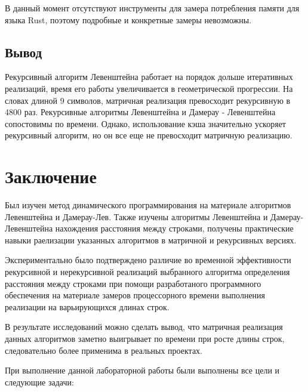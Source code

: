 \documentclass[12pt]{report}
\begin{document}
	\par
	В данный момент отсутствуют инструменты для замера потребления памяти для языка Rust, поэтому подробные и конкретные замеры невозможны.

	\section{Вывод}

	\par
	Рекурсивный алгоритм Левенштейна работает на порядок дольше итеративных реализаций, время его работы увеличивается в геометрической прогрессии. На словах длиной 9 символов, матричная реализация превосходит рекурсивную в 4800 раз. Рекурсивные алгоритмы Левенштейна и Дамерау - Левенштейна сопостовимы по времени. Однако, использование кэша значительно ускоряет рекурсивный алгоритм, но он все еще не превосходит матричную реализацию.

	\chapter*{Заключение}

	Был изучен метод динамического программирования на материале алгоритмов Левенштейна и Дамерау-Лев.
	Также изучены алгоритмы Левенштейна и Дамерау-Левенштейна нахождения расстояния между строками, получены практические навыки раелизации указанных алгоритмов
	в матричной  и рекурсивных версиях. 

	Экспериментально было подтверждено различие во временной эффективности рекурсивной и нерекурсивной реализаций выбранного алгоритма определения расстояния между строками при помощи разработаного программного обеспечения на материале замеров процессорного времени выполнения реализации на варьирующихся длинах строк. 

	В результате исследований можно сделать вывод, что матричная реализация данных алгоритмов заметно выигрывает по времени при росте длины строк, следовательно более применима в реальных проектах.
	
	При выполнение данной лабораторной работы были выполнены все цели и следующие задачи:
\end{document}
